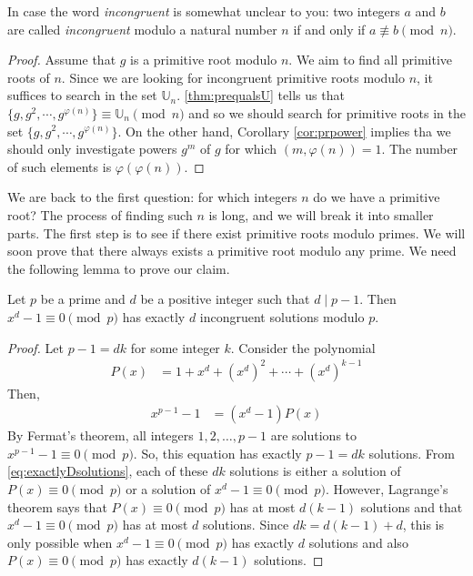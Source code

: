 \documentclass{subfile}
\begin{document}
	\begin{note}
		In case the word \textit{incongruent} is somewhat unclear to you: two integers $a$ and $b$ are called \textit{incongruent} modulo a natural number $n$ if and only if $a \not \equiv b \pmod n$.
	\end{note}

	\begin{proof}
		Assume that $g$ is a primitive root modulo $n$. We aim to find all primitive roots of $n$. Since we are looking for incongruent primitive roots modulo $n$, it suffices to search in the set $\mathbb U_n$. \autoref{thm:prequalsU} tells us that $\{g,g^2,\cdots,g^{\varphi(n)}\} \equiv \mathbb U_n \pmod n$ and so we should search for primitive roots in the set $\{g,g^2,\cdots,g^{\varphi(n)}\}$. On the other hand, Corollary \ref{cor:prpower} implies tha we should only investigate powers $g^m$ of $g$ for which $(m, \varphi(n))=1$. The number of such elements is $\varphi(\varphi(n))$.
	\end{proof}

We are back to the first question: for which integers $n$ do we have a primitive root? The process of finding such $n$ is long, and we will break it into smaller parts. The first step is to see if there exist primitive roots modulo primes. We will soon prove that there always exists a primitive root modulo any prime. We need the following lemma to prove our claim.

	\begin{lemma}\label{lem:exactlyDsolutions}
		Let $p$ be a prime and $d$ be a positive integer such that $d \mid p-1$. Then $x^d -1 \equiv 0 \pmod p$ has exactly $d$ incongruent solutions modulo $p$.
	\end{lemma}

	\begin{proof}
		Let $p-1=dk$ for some integer $k$. Consider the polynomial
			\begin{align*}
				P(x)
					& = 1+x^d + \left(x^d\right)^2 + \cdots + \left(x^d\right)^{k-1}
			\end{align*}
		Then,
			\begin{align}\label{eq:exactlyDsolutions}
				x^{p-1} -1
					& = (x^d-1)P(x)
			\end{align}
		By Fermat's theorem, all integers $1, 2, \ldots, p-1$ are solutions to $x^{p-1}-1 \equiv 0 \pmod p$. So, this equation has exactly $p-1=dk$ solutions. From \eqref{eq:exactlyDsolutions}, each of these $dk$ solutions is either a solution of $P(x) \equiv 0 \pmod p$ or a solution of $x^d-1 \equiv 0 \pmod p$. However, Lagrange's theorem says that $P(x) \equiv 0 \pmod p$ has at most $d(k-1)$ solutions and that $x^d-1 \equiv 0 \pmod p$ has at most $d$ solutions. Since $dk=d(k-1)+d$, this is only possible when $x^d-1 \equiv 0 \pmod p$ has exactly $d$ solutions and also $P(x) \equiv 0 \pmod p$ has exactly $d(k-1)$ solutions.
	\end{proof}
\end{document}
